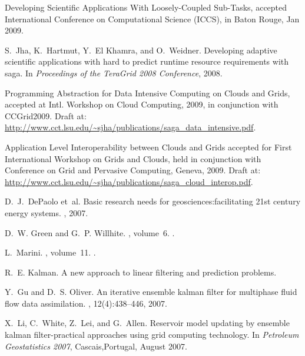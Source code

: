 \begin{thebibliography}{10}
Developing Scientific Applications With Loosely-Coupled Sub-Tasks, accepted
  International Conference on Computational Science (ICCS), in Baton Rouge, Jan
  2009.

S.~Jha, K.~Hartmut, Y.~El Khamra, and O.~Weidner.
\newblock Developing adaptive scientific applications with hard to predict
  runtime resource requirements with saga.
\newblock In {\em Proceedings of the TeraGrid 2008 Conference}, 2008.

Programming Abstraction for Data Intensive Computing on Clouds and Grids,
  accepted at Intl. Workshop on Cloud Computing, 2009, in conjunction with
  CCGrid2009. Draft at:
  {\href{http://www.cct.lsu.edu/~sjha/publications/saga\_data\_intensive.pdf}{%
\url{http://www.cct.lsu.edu/~sjha/publications/saga\_data\_intensive.pdf}}}.

Application Level Interoperability between Clouds and Grids accepted for First
  International Workshop on Grids and Clouds, held in conjunction with
  Conference on Grid and Pervasive Computing, Geneva, 2009. Draft at: \\
  \url{http://www.cct.lsu.edu/~sjha/publications/saga\_cloud\_interop.pdf}.

D.~J.~DePaolo et~al.
\newblock Basic research needs for geosciences:facilitating 21st century energy
  systems.
,
  2007.

D.~W. Green and G.~P. Willhite.
, volume~6.
.

L.~Marini.
, volume~11.
.

R.~E. Kalman.
\newblock A new approach to linear filtering and prediction problems.

Y.~Gu and D.~S. Oliver.
\newblock An iterative ensemble kalman filter for multiphase fluid flow data
  assimilation.
, 12(4):438--446, 2007.

X.~Li, C.~White, Z.~Lei, and G.~Allen.
\newblock Reservoir model updating by ensemble kalman filter-practical
  approaches using grid computing technology.
\newblock In {\em Petroleum Geostatistics 2007}, Cascais,Portugal, August 2007.


\end{thebibliography}
